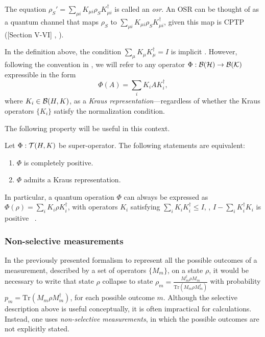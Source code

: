\begin{definition}
  The equation $ \rho_{S}' = \sum_{\mu i} K_{\mu i} \rho_{S} K_{\mu i}^{\dag} $ is called an \emph{\acrfull{osr}}. An OSR can be thought of as a quantum channel that maps $\rho_{S}$ to $\sum_{\mu i} K_{\mu i} \rho_{S} K_{\mu i}^{\dag}$, given this map is CPTP ([Section V-VI] \cite{lidar2019lecture}, \cite[Chapter 8.2.3]{nielsen2010quantum}). 
\end{definition}


In the definition above, the condition $\sum_{\mu} K_{\mu} K_{\mu}^{\dag} = I$ is implicit \cite{lidar2019lecture,nielsen2010quantum}. However, following the convention in \cite{watrous2018theory}, we will refer to any operator $\Phi: \mathcal{B}(\mathcal{H}) \to \mathcal{B}(\mathcal{K})$ expressible in the form  
\[
\Phi(A) = \sum_i K_i A K_i^\dag,  
\]  
where $K_i \in \mathcal{B}(H,K)$, as a \emph{Kraus representation}---regardless of whether the Kraus operators $\{K_i\}$ satisfy the normalization condition. 

The following property will be useful in this context.

\begin{theorem} \cite[Theorem 2.22 ]{watrous2018theory} \label{thm:cp_kraus}
  Let $\Phi:\mathcal{T}(H,K)$ be super-operator. The following statements are equivalent:
  \begin{enumerate}
    \item  $\Phi$ is completely positive.
    \item  $\Phi$ admits a Kraus representation.
  \end{enumerate}
\end{theorem}

In particular, a quantum operation $\Phi$ can always be expressed as $\Phi(\rho) = \sum_i K_i \rho K_i^\dag$,  with operators $K_i$ satisfying $\sum_i K_i K_i^\dag \leq I$, \ie, $I - \sum_i K_i^\dagger K_i$ is positive ~\cite[Theorem~8.1]{nielsen2010quantum}.






\subsubsection{Non-selective measurements}

In the previously presented formalism to represent all the possible outcomes of a measurement, described by a set of operators $\{M_{m}\}$, on a state $\rho$, it would be necessary to write that state $\rho$ collapse to state $\rho_m=\frac{M_{m}^{\dag}\rho M_{m}}{\text{Tr}(M_{m}\rho M_{m}^{\dag})}$ with probability $p_m=\text{Tr}(M_{m}\rho M_{m}^{\dag})$, for each possible outcome $m$. Although the selective description above is useful conceptually, it is often impractical for calculations. Instead, one uses \emph{non-selective measurements}, in which the possible outcomes are not explicitly stated.



